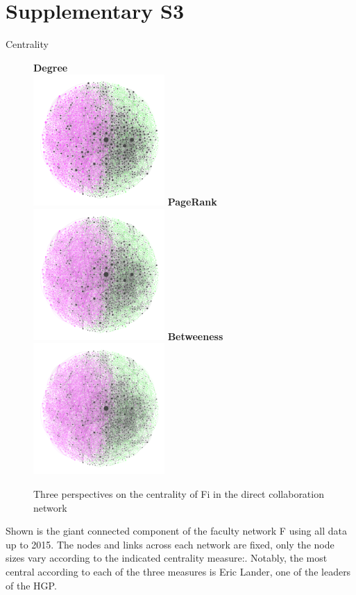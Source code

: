 \documentclass[10pt]{article}         %
\begin{document}
\section{Supplementary S3}
Centrality\\
\begin{figure}[!htb]
  \textbf{Degree}\\
  \includegraphics[width=5cm, height=5cm]{S3Degree.png}
\endminipage\hfill
{}
  \textbf{PageRank}\\
  \includegraphics[width=5cm, height=5cm]{S3PageRank.png}
\endminipage\hfill
{}%
  \textbf{Betweeness}\\
  \includegraphics[width=5cm, height=5cm]{S3Betweeness.png}
\endminipage
\caption{Three perspectives on the centrality of Fi in the direct collaboration network}\label{fig:s3}
\end{figure}

Shown is the giant connected component of the faculty network F using all data up to 2015. The nodes and links across each network are fixed, only the node sizes vary according to the indicated centrality measure:. Notably, the most central according to each of the three measures is Eric Lander, one of the leaders of the HGP.
\end{document}
